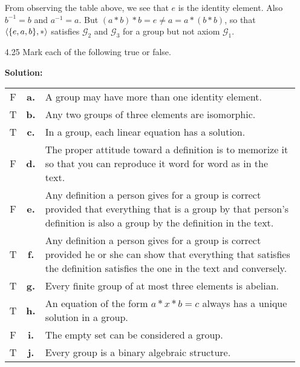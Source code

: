\begin{enumerate}
      From observing the table above, we see that $e$ is the identity element.
      Also $b^{-1} = b$ and $a^{-1} = a$. But
      $(a * b) * b = e \neq a = a * (b * b)$, so that $\langle \{e, a, b\}, * \rangle$ 
      satisfies $\mathscr{G}_2$ and $\mathscr{G}_3$ for a group but not axiom
      $\mathscr{G}_1$.
      
   \item[4.25] Mark each of the following true or false.

      \textbf{Solution:}

      \begin{tabularx}{\linewidth}{@{}c c X@{}} 
         F & \textbf{a.} & A group may have more than one identity element. \\
         T & \textbf{b.} & Any two groups of three elements are isomorphic. \\
         T & \textbf{c.} & In a group, each linear equation has a solution. \\
         F & \textbf{d.} & The proper attitude toward a definition is to
                           memorize it so that you can reproduce it word for
                           word as in the text. \\
         F & \textbf{e.} & Any definition a person gives for a group is correct
                           provided that everything that is a group by that
                           person's definition is also a group by the
                           definition in the text. \\
         T & \textbf{f.} & Any definition a person gives for a group is correct
                           provided he or she can show that everything that
                           satisfies the definition satisfies the one in the
                           text and conversely. \\
         T & \textbf{g.} & Every finite group of at most three elements is
                           abelian. \\
         T & \textbf{h.} & An equation of the form $a * x * b = c$ always has a
                           unique solution in a group. \\
         F & \textbf{i.} & The empty set can be considered a group. \\
         T & \textbf{j.} & Every group is a binary algebraic structure.
      \end{tabularx}
\end{enumerate}

